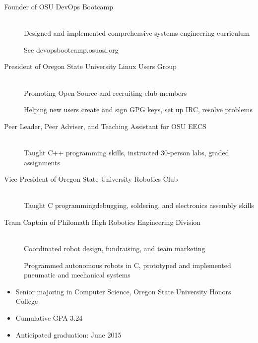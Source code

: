 \documentclass[11pt]{article}
\begin{document}
\begin{description}
    \item[Founder of OSU DevOps Bootcamp]
        \hfill \\
        Designed and implemented comprehensive systems engineering curriculum

        See devopsbootcamp.osuosl.org

    \item[President of Oregon State University Linux Users Group]
        \hfill \\
        Promoting Open Source and recruiting club members

        Helping new users create and sign GPG keys, set up IRC, resolve problems

   \item[Peer Leader, Peer Adviser, and Teaching Assistant for OSU EECS]
        \hfill \\ 
        Taught C++ programming skills, instructed 30-person labs, graded 
        assignments
        
    \item[Vice President of Oregon State University Robotics Club]
        \hfill \\
        Taught C programming\/debugging, soldering, and electronics assembly skills

    \item[Team Captain of Philomath High Robotics Engineering Division]
        \hfill \\
        Coordinated robot design, fundraising, and team marketing

        Programmed autonomous robots in C, prototyped and implemented
        pneumatic and mechanical systems        

\end{description}

\smallskip
\hrulefill
\bigskip

\begin{itemize}
    \item Senior majoring in Computer Science, Oregon State University 
          Honors College

    \item Cumulative GPA 3.24

    \item Anticipated graduation: June 2015

\end{itemize}
\end{document}
